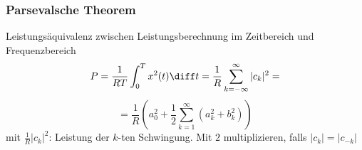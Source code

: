 \begin{sectionbox}
    \subsubsection{Parsevalsche Theorem}
    Leistungsäquivalenz zwischen Leistungsberechnung im Zeitbereich und Frequenzbereich
    \begin{equation*}
        P=\frac{1}{RT}\int_0^Tx^2(t)\diff t = \frac{1}{R}\sum_{k=-\infty}^{\infty}|c_k|^2=
    \end{equation*}
    \begin{equation*}
        =\frac{1}{R}\left(a_0^2 + \frac{1}{2}\sum_{k=1}^\infty(a_k^2+b_k^2)\right)
    \end{equation*}
    mit $\frac{1}{R} |c_k|^2$: Leistung der $k$-ten Schwingung. Mit $2$ multiplizieren, falls $|c_k|=|c_{-k}|$
\end{sectionbox}